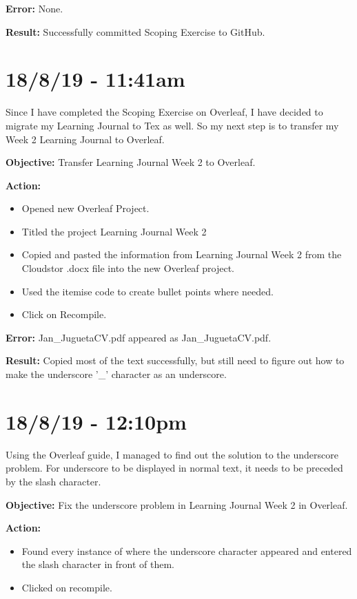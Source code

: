 \documentclass{article}
\begin{document}
\textbf{Error:} None.

\textbf{Result:} Successfully committed Scoping Exercise to GitHub.

\section*{18/8/19 - 11:41am}

Since I have completed the Scoping Exercise on Overleaf, I have decided to migrate my Learning Journal to Tex as well. So my next step is to transfer my Week 2 Learning Journal to Overleaf.

\textbf{Objective:} Transfer Learning Journal Week 2 to Overleaf.

\textbf{Action:}
\begin{itemize}
    \item Opened new Overleaf Project. 
    \item Titled the project Learning Journal Week 2
    \item Copied and pasted the information from Learning Journal Week 2 from the Cloudstor .docx file into the new Overleaf project.
    \item Used the itemise code to create bullet points where needed.
    \item Click on Recompile.
\end{itemize}

\textbf{Error:} Jan\_JuguetaCV.pdf appeared as Jan_JuguetaCV.pdf.

\textbf{Result:} Copied most of the text successfully, but still need to figure out how to make the underscore '\_' character as an underscore.

\section*{18/8/19 - 12:10pm}

Using the Overleaf guide, I managed to find out the solution to the underscore problem. For underscore to be displayed in normal text, it needs to be preceded by the slash character. 

\textbf{Objective:} Fix the underscore problem in Learning Journal Week 2 in Overleaf.

\textbf{Action:}
\begin{itemize}
    \item Found every instance of where the underscore character appeared and entered the slash character in front of them.
    \item Clicked on recompile.
\end{itemize}
\end{document}

